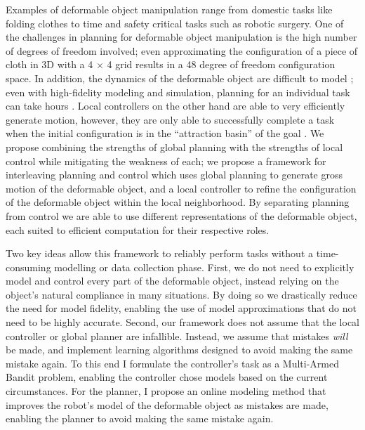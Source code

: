 Examples of deformable object manipulation range from domestic tasks like folding clothes to time and safety critical tasks such as robotic surgery. One of the challenges in planning for deformable object manipulation is the high number of degrees of freedom involved; even approximating the configuration of a piece of cloth in 3D with a 4 $\times$ 4 grid results in a 48 degree of freedom configuration space. In addition, the dynamics of the deformable object are difficult to model \citep{Essahbi2012}; even with high-fidelity modeling and simulation, planning for an individual task can take hours \citep{Bai2016}. Local controllers on the other hand are able to very efficiently generate motion, however, they are only able to successfully complete a task when the initial configuration is in the ``attraction basin'' of the goal \citep{Berenson2013,McConachie2018}. We propose combining the strengths of global planning with the strengths of local control while mitigating the weakness of each; we propose a framework for interleaving planning and control which uses global planning to generate gross motion of the deformable object, and a local controller to refine the configuration of the deformable object within the local neighborhood. By separating planning from control we are able to use different representations of the deformable object, each suited to efficient computation for their respective roles.

Two key ideas allow this framework to reliably perform tasks without a time-consuming modelling or data collection phase. First, we do not need to explicitly model and control every part of the deformable object, instead relying on the object's natural compliance in many situations. By doing so we drastically reduce the need for model fidelity, enabling the use of model approximations that do not need to be highly accurate. Second, our framework does not assume that the local controller or global planner are infallible. Instead, we assume that mistakes \textit{will} be made, and implement learning algorithms designed to avoid making the same mistake again. To this end I formulate the controller's task as a Multi-Armed Bandit problem, enabling the controller chose models based on the current circumstances. For the planner, I propose an online modeling method that improves the robot's model of the deformable object as mistakes are made, enabling the planner to avoid making the same mistake again.

